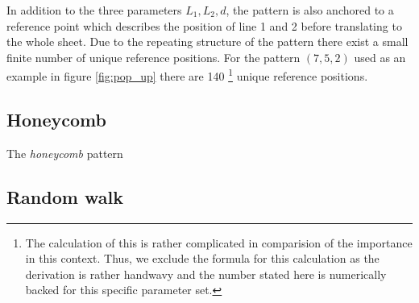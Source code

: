 In addition to the three parameters $L_1, L_2, d$, the pattern is also anchored to a reference point which describes the position of line 1 and 2 before translating to the whole sheet. Due to the repeating structure of the pattern there exist a small finite number of unique reference positions. For the pattern $(7, 5, 2)$ used as an example in figure \ref{fig:pop_up} there are 140 \footnote{The calculation of this is rather complicated in comparision of the importance in this context. Thus, we exclude the formula for this calculation as the derivation is rather handwavy and the number stated here is numerically backed for this specific parameter set.} unique reference positions.


\subsection{Honeycomb}
The \textit{honeycomb} pattern 

\subsection{Random walk}





